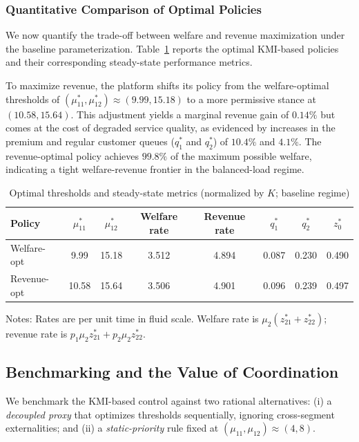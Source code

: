 \subsubsection{Quantitative Comparison of Optimal Policies}
We now quantify the trade-off between welfare and revenue maximization under the baseline parameterization.
Table~\ref{tab:exp-table} reports the optimal KMI-based policies and their corresponding steady-state performance metrics.

To maximize revenue, the platform shifts its policy from the welfare-optimal thresholds of $(\mu_{11}^*, \mu_{12}^*) \approx (9.99, 15.18)$ to a more permissive stance at $(10.58, 15.64)$.
This adjustment yields a marginal revenue gain of $0.14\%$ but comes at the cost of degraded service quality, as evidenced by increases in the premium and regular customer queues ($q_1^*$ and $q_2^*$) of $10.4\%$ and $4.1\%$.
The revenue-optimal policy achieves $99.8\%$ of the maximum possible welfare, indicating a tight welfare-revenue frontier in the balanced-load regime.

\begin{table}[ht]
\centering
\caption{Optimal thresholds and steady-state metrics (normalized by $K$; baseline regime)}
\label{tab:exp-table}
\small
\begin{tabular}{lccccccc}
\hline
Policy & $\mu_{11}^*$ & $\mu_{12}^*$ & Welfare rate & Revenue rate & $q_1^*$ & $q_2^*$ & $z_0^*$ \\
\hline
Welfare-opt & 9.99 & 15.18 & 3.512 & 4.894 & 0.087 & 0.230 & 0.490 \\
Revenue-opt & 10.58 & 15.64 & 3.506 & 4.901 & 0.096 & 0.239 & 0.497 \\
\hline
\end{tabular}
\vspace{0.25em}
\begin{minipage}{0.95\linewidth}
\footnotesize Notes: Rates are per unit time in fluid scale. Welfare rate is $\mu_2(z_{21}^*{+}z_{22}^*)$; 
revenue rate is $p_1\mu_2 z_{21}^*{+}p_2\mu_2 z_{22}^*$.
\end{minipage}
\end{table}

\subsection{Benchmarking and the Value of Coordination}
\label{sec:benchmarking}

We benchmark the KMI-based control against two rational alternatives: (i) a \textit{decoupled proxy} that optimizes thresholds sequentially, ignoring cross-segment externalities; and (ii) a \textit{static-priority} rule fixed at $(\mu_{11}, \mu_{12}) \approx (4,8)$.

